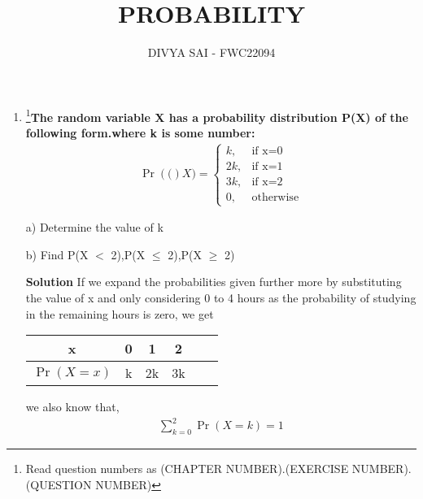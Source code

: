 \documentclass{article}
\providecommand{\pr}[1]{\ensuremath{\Pr\left(#1\right)}}
\begin{document}
\title{PROBABILITY}
\author{\Large DIVYA SAI - FWC22094}
\date{}

\maketitle
\begin{enumerate}
[label=16.\arabic{enumi}.\arabic{enumii}]%
\setcounter{enumi}{3}
\setcounter{enumii}{10}

\item \footnote{Read question numbers as (CHAPTER NUMBER).(EXERCISE NUMBER).(QUESTION NUMBER)}\textbf {The random variable X has a probability distribution P(X) of the following form.where k is some number: }
\begin{align}
  \pr(X) =
    \begin{cases}
      k,  & \text{if x=0}\\
      2k, & \text{if x=1}\\
      3k, & \text{if x=2}\\
      0 , & \text{otherwise}
    \end{cases}       
\end{align}

a) Determine the value of k 

b) Find P(X $<$ 2),P(X $\leq$ 2),P(X $\geq$ 2)  


\textbf{Solution}
If we expand the probabilities given further more
by substituting the value of x and only considering
0 to 4 hours as the probability of studying in the
remaining hours is zero, we get\\
\begin{center}
\begin{tabular}{|c|c|c|c|c|c|}
    \hline
    x &  0 & 1 & 2 \\
    \hline
    $\pr{X=x}$ & k & 2k & 3k\\
    \hline  
\end{tabular}
\end{center}

we also know that,
\begin{align}
    \sum_{k = 0}^2 \pr{X = k} = 1 \label{eq 2.0.1}
\end{align}


\end{enumerate}
\end{document}
